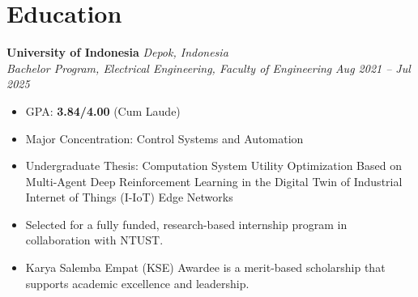 \section*{Education}

\noindent\textbf{University of Indonesia} \hfill \textit{Depok, Indonesia}\\
\textit{Bachelor Program, Electrical Engineering, Faculty of Engineering} \hfill \textit{Aug 2021 -- Jul 2025}
\begin{itemize}\itemsep0em
  \item GPA: \textbf{3.84/4.00} (Cum Laude)
  \item Major Concentration: Control Systems and Automation
  \item Undergraduate Thesis: Computation System Utility Optimization Based on Multi-Agent Deep Reinforcement Learning in the Digital Twin of Industrial Internet of Things (I-IoT) Edge Networks
  \item Selected for a fully funded, research-based internship program in collaboration with NTUST.
  \item Karya Salemba Empat (KSE) Awardee is a merit-based scholarship that supports academic excellence and leadership.
\end{itemize}